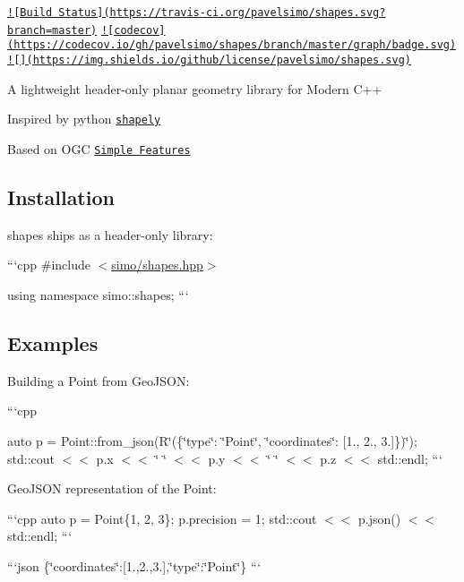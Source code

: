 \href{https://travis-ci.org/pavelsimo/shapes}{\tt !\mbox{[}Build Status\mbox{]}(https\-://travis-\/ci.\-org/pavelsimo/shapes.\-svg?branch=master)} \href{https://codecov.io/gh/pavelsimo/shapes}{\tt !\mbox{[}codecov\mbox{]}(https\-://codecov.\-io/gh/pavelsimo/shapes/branch/master/graph/badge.\-svg)} \href{https://github.com/pavelsimo/shapes/blob/master/LICENSE}{\tt !\mbox{[}\mbox{]}(https\-://img.\-shields.\-io/github/license/pavelsimo/shapes.\-svg)}

A lightweight header-\/only planar geometry library for Modern C++


\begin{DoxyItemize}
\item Inspired by python \href{https://pypi.org/project/Shapely/}{\tt shapely}
\item Based on O\-G\-C \href{https://en.wikipedia.org/wiki/Simple_Features}{\tt Simple Features}
\end{DoxyItemize}

\subsection*{Installation}

{\ttfamily shapes} ships as a header-\/only library\-:

```cpp \#include $<$\hyperlink{shapes_8hpp_source}{simo/shapes.\-hpp}$>$

using namespace simo\-::shapes; ```

\subsection*{Examples}

Building a {\ttfamily Point} from Geo\-J\-S\-O\-N\-:

```cpp

auto p = Point\-::from\-\_\-json(R\char`\"{}(\{\char`\"{}type\char`\"{}\-: \char`\"{}Point\char`\"{}, \char`\"{}coordinates\char`\"{}\-: \mbox{[}1., 2., 3.\mbox{]}\})\char`\"{}); std\-::cout $<$$<$ p.\-x $<$$<$ \char`\"{} \char`\"{} $<$$<$ p.\-y $<$$<$ \char`\"{} \char`\"{} $<$$<$ p.\-z $<$$<$ std\-::endl; ```

Geo\-J\-S\-O\-N representation of the {\ttfamily Point}\-:

```cpp auto p = Point\{1, 2, 3\}; p.\-precision = 1; std\-::cout $<$$<$ p.\-json() $<$$<$ std\-::endl; ```

```json \{\char`\"{}coordinates\char`\"{}\-:\mbox{[}1.,2.,3.\mbox{]},\char`\"{}type\char`\"{}\-:\char`\"{}\-Point\char`\"{}\} ```


